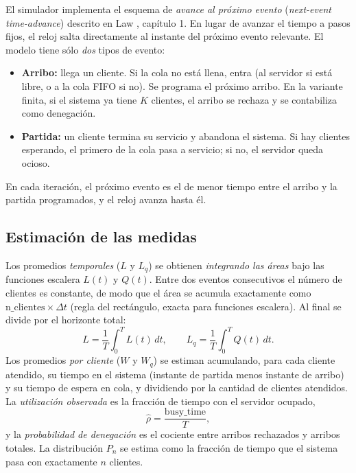 \documentclass[11pt]{article}
\begin{document}
El simulador implementa el esquema de \emph{avance al pr\'oximo evento}
(\emph{next-event time-advance}) descrito en Law \cite{law}, cap\'itulo 1.
En lugar de avanzar el tiempo a pasos fijos, el reloj salta directamente al
instante del pr\'oximo evento relevante. El modelo tiene s\'olo \emph{dos}
tipos de evento:
\begin{itemize}
  \item \textbf{Arribo:} llega un cliente. Si la cola no est\'a llena, entra
    (al servidor si est\'a libre, o a la cola FIFO si no). Se programa el
    pr\'oximo arribo. En la variante finita, si el sistema ya tiene $K$
    clientes, el arribo se rechaza y se contabiliza como denegaci\'on.
  \item \textbf{Partida:} un cliente termina su servicio y abandona el
    sistema. Si hay clientes esperando, el primero de la cola pasa a
    servicio; si no, el servidor queda ocioso.
\end{itemize}
En cada iteraci\'on, el pr\'oximo evento es el de menor tiempo entre el
arribo y la partida programados, y el reloj avanza hasta \'el.

\subsection{Estimaci\'on de las medidas}

Los promedios \emph{temporales} ($L$ y $L_q$) se obtienen \emph{integrando
las \'areas} bajo las funciones escalera $L(t)$ y $Q(t)$. Entre dos eventos
consecutivos el n\'umero de clientes es constante, de modo que el \'area se
acumula exactamente como $\text{n\_clientes} \times \Delta t$ (regla del
rect\'angulo, exacta para funciones escalera). Al final se divide por el
horizonte total:
\begin{equation}
L = \frac{1}{T}\int_0^{T} L(t)\,dt,
\qquad
L_q = \frac{1}{T}\int_0^{T} Q(t)\,dt.
\end{equation}
Los promedios \emph{por cliente} ($W$ y $W_q$) se estiman acumulando, para
cada cliente atendido, su tiempo en el sistema (instante de partida menos
instante de arribo) y su tiempo de espera en cola, y dividiendo por la
cantidad de clientes atendidos. La \emph{utilizaci\'on observada} es la
fracci\'on de tiempo con el servidor ocupado,
\begin{equation}
\hat{\rho} = \frac{\text{busy\_time}}{T},
\end{equation}
y la \emph{probabilidad de denegaci\'on} es el cociente entre arribos
rechazados y arribos totales. La distribuci\'on $P_n$ se estima como la
fracci\'on de tiempo que el sistema pasa con exactamente $n$ clientes.
\end{document}
